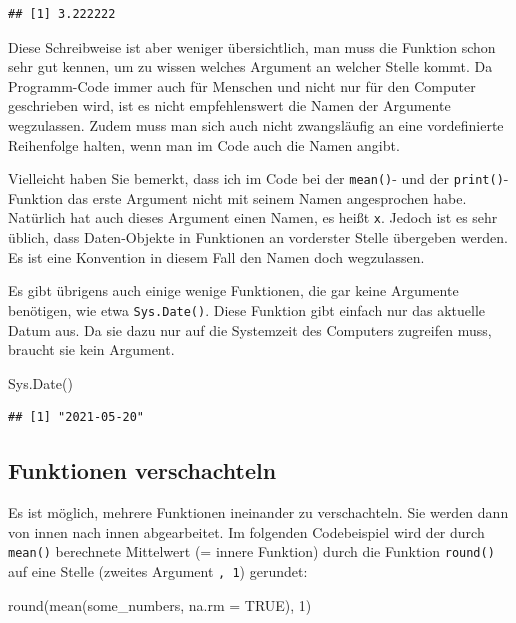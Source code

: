 \documentclass[
]{book}
\newenvironment{Shaded}{\begin{snugshade}}{\end{snugshade}}
\newcommand{\AttributeTok}[1]{\textcolor[rgb]{0.77,0.63,0.00}{#1}}
\newcommand{\ConstantTok}[1]{\textcolor[rgb]{0.00,0.00,0.00}{#1}}
\newcommand{\DecValTok}[1]{\textcolor[rgb]{0.00,0.00,0.81}{#1}}
\newcommand{\FunctionTok}[1]{\textcolor[rgb]{0.00,0.00,0.00}{#1}}
\newcommand{\NormalTok}[1]{#1}
\begin{document}
\begin{verbatim}
## [1] 3.222222
\end{verbatim}

Diese Schreibweise ist aber weniger übersichtlich, man muss die Funktion schon sehr gut kennen, um zu wissen welches Argument an welcher Stelle kommt. Da Programm-Code immer auch für Menschen und nicht nur für den Computer geschrieben wird, ist es nicht empfehlenswert die Namen der Argumente wegzulassen. Zudem muss man sich auch nicht zwangsläufig an eine vordefinierte Reihenfolge halten, wenn man im Code auch die Namen angibt.

Vielleicht haben Sie bemerkt, dass ich im Code bei der \texttt{mean()}- und der \texttt{print()}-Funktion das erste Argument nicht mit seinem Namen angesprochen habe. Natürlich hat auch dieses Argument einen Namen, es heißt \texttt{x}. Jedoch ist es sehr üblich, dass Daten-Objekte in Funktionen an vorderster Stelle übergeben werden. Es ist eine Konvention in diesem Fall den Namen doch wegzulassen.

Es gibt übrigens auch einige wenige Funktionen, die gar keine Argumente benötigen, wie etwa \texttt{Sys.Date()}. Diese Funktion gibt einfach nur das aktuelle Datum aus. Da sie dazu nur auf die Systemzeit des Computers zugreifen muss, braucht sie kein Argument.

\begin{Shaded}
\begin{Highlighting}[]
\FunctionTok{Sys.Date}\NormalTok{()}
\end{Highlighting}
\end{Shaded}

\begin{verbatim}
## [1] "2021-05-20"
\end{verbatim}

\hypertarget{funktionen-verschachteln}{%
\subsection{Funktionen verschachteln}\label{funktionen-verschachteln}}

Es ist möglich, mehrere Funktionen ineinander zu verschachteln. Sie werden dann von innen nach innen abgearbeitet. Im folgenden Codebeispiel wird der durch \texttt{mean()} berechnete Mittelwert (= innere Funktion) durch die Funktion \texttt{round()} auf eine Stelle (zweites Argument \texttt{,\ 1}) gerundet:

\begin{Shaded}
\begin{Highlighting}[]
\FunctionTok{round}\NormalTok{(}\FunctionTok{mean}\NormalTok{(some\_numbers, }\AttributeTok{na.rm =} \ConstantTok{TRUE}\NormalTok{), }\DecValTok{1}\NormalTok{)}
\end{Highlighting}
\end{Shaded}
\end{document}
